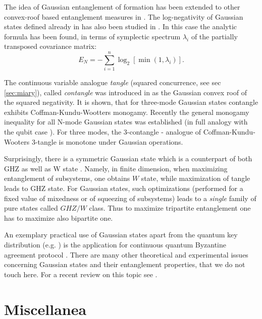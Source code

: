 \documentclass[twocolumn,aps,rmp]{revtex4}
\begin{document}
The idea of Gaussian entanglement of formation has been extended to
other convex-roof based entanglement measures in
\cite{GNeg_AdeFab}. The log-negativity of Gaussian states defined
already in \cite{Vidal-Werner} has also been studied in
\cite{GNeg_AdeFab}. In this case the analytic formula has been found,
in terms of symplectic spectrum $\lambda_i$ of the partially
transposed covariance matrix:
\begin{equation}
E_N = -\sum_{i=1}^{n}\log_2 [\min(1,\lambda_i)].
\end{equation}

The continuous variable analogue {\it tangle} (squared concurrence, see sec \ref{sec:miary}), called
{\it contangle} was introduced in \cite{GTangle_AdeFab} as the Gaussian convex
roof of the squared negativity. It is shown, that for three-mode
Gaussian states contangle exhibits Coffman-Kundu-Wootters monogamy.
Recently the general monogamy inequality for all N-mode Gaussian states
was established \cite{HiroshimaAI2007} (in full analogy with the qubit case \cite {OsborneV-monogamy}).
For three modes, the 3-contangle  - analogue of Coffman-Kundu-Wooters 3-tangle is monotone under Gaussian operations.

Surprisingly, there is a symmetric Gaussian state which is a
counterpart of both GHZ as well as W state \cite{GTangle_AdeFab}.
Namely, in finite dimension, when maximizing entanglement of
subsystems, one obtains $W$ state, while maximization of tangle leads
to GHZ state. For Gaussian states, such optimizations (performed for a
fixed value of mixedness or of squeezing of subsystems) leads to a
{\it single} family of pure states called $GHZ/W$ class. Thus to
maximize tripartite entanglement one has to maximize also bipartite
one.


An exemplary practical use of Gaussian states apart from the quantum
key distribution (e.g. \cite{Gcrypto_GottesmanPreskill}) is the
application for continuous quantum Byzantine agreement protocol
\cite{GByzant_NeigSan}. There are many  other theoretical and experimental issues
concerning Gaussian states and their entanglement properties,
that we do not touch here. For a recent review on this topic see
\cite{G_review05,AdessoFE2007}.



\section{Miscellanea}
\end{document}
